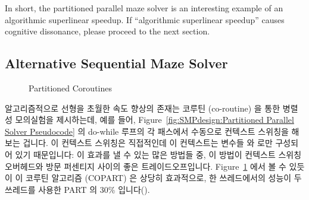 In short, the partitioned parallel maze solver is an interesting example
of an algorithmic superlinear speedup.
If ``algorithmic superlinear speedup'' causes cognitive dissonance,
please proceed to the next section.
\fi

\subsection{Alternative Sequential Maze Solver}
\label{sec:SMPdesign:Alternative Sequential Maze Solver}

\begin{figure}[tb]
\centering
{}
\caption{Partitioned Coroutines}
\label{fig:SMPdesign:Partitioned Coroutines}
\end{figure}

알고리즘적으로 선형을 초월한 속도 향상의 존재는 코루틴 (co-routine) 을 통한
병렬성 모의실험을 제시하는데, 예를 들어, Figure~\ref{fig:SMPdesign:Partitioned
Parallel Solver Pseudocode} 의 do-while 루프의 각 패스에서 수동으로 컨텍스트
스위칭을 해보는 겁니다.
이 컨텍스트 스위칭은 직접적인데 이 컨텍스트는 변수들  와  로만
구성되어 있기 때문입니다: 이 효과를 낼 수 있는 많은 방법들 중, 이 방법이
컨텍스트 스위칭 오버헤드와 방문 퍼센티지 사이의 좋은 트레이드오프입니다.
Figure~\ref{fig:SMPdesign:Partitioned Coroutines} 에서 볼 수 있듯이 이 코루틴
알고리즘 (COPART) 은 상당히 효과적으로, 한 쓰레드에서의 성능이 두 쓰레드를
사용한 PART 의 30\% 입니다().
\iffalse

